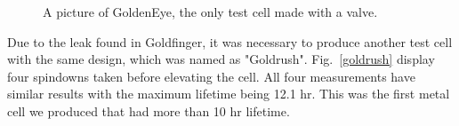 \begin{figure}[t!]
	\centering
	\caption{{A picture of GoldenEye, the only test cell made with a valve.}}
	\label{goldeneye}
\end{figure}

Due to the leak found in Goldfinger, it was necessary to produce another test cell with the same design, which was named as "Goldrush". Fig.~\ref{goldrush} display four spindowns taken before elevating the cell. All four measurements have similar results with the maximum lifetime being 12.1 hr. This was the first metal cell we produced that had more than 10 hr lifetime. 

